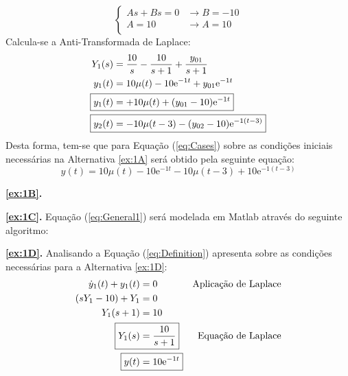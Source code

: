 \documentclass{article}
\begin{document}
\begin{resolution}
\begin{equation*}
\begin{cases}
                            As + Bs = 0 & \rightarrow \boxed{B =-10}\\[1.5mm]
                            A = 10      & \rightarrow \boxed{A = 10}\\
                        \end{cases}
                    \end{equation*}
                Calcula-se a Anti-Transformada de Laplace:
                    \begin{align}
                        Y_{1}(s) &= \frac{10}{s} - \frac{10}{s + 1} + \frac{y_{01}}{s + 1}\nonumber\\
                        y_{1}(t) &= 10\mu(t) - 10\text{e}^{-1t} + y_{01}\text{e}^{-1t}\nonumber\\
                        \Aboxed{y_{1}(t) &=+10\mu(t) + (y_{01} - 10)\text{e}^{-1t}}\\
                        \Aboxed{y_{2}(t) &=-10\mu(t-3) - (y_{02} - 10)\text{e}^{-1(t-3)}}
                    \end{align}
                Desta forma, tem-se que para Equação (\ref{eq:Cases}) sobre as condições iniciais necessárias na Alternativa \ref{ex:1A} será obtido pela seguinte equação:
                    \begin{equation}
                        \boxed{
                            y(t) = 10\mu(t) - 10\text{e}^{-1t} -10\mu(t-3) + 10\text{e}^{-1(t-3)}
                        }\label{eq:General1}
                    \end{equation}
            \end{resolution}
\newpage
            \begin{resolution}
                \textbf{\ref{ex:1B}.} 
            \end{resolution}
\newpage
            \begin{resolution}
                \textbf{\ref{ex:1C}.} Equação (\ref{eq:General1}) será modelada em Matlab através do seguinte algoritmo:
                \begin{scriptsize}
                    \myOctave
                    
                \end{scriptsize}
            \end{resolution}
\newpage
            \begin{resolution}
                \textbf{\ref{ex:1D}.} Analisando a Equação (\ref{eq:Definition}) apresenta sobre as condições necessárias para a Alternativa \ref{ex:1D}:
                    \begin{align}
                        \dot{y}_{1}(t) + y_{1}(t) &= 0 & \text{Aplicação de Laplace}\nonumber\\
                        (sY_{1} - 10) + Y_{1}     &= 0\nonumber\\
                        Y_{1}(s + 1)     &= 10\nonumber\\
                        \Aboxed{Y_{1}(s) &= \frac{10}{s + 1}} & \text{Equação de Laplace}\\
                        \Aboxed{y(t)     &= 10\text{e}^{-1t}}
                    \end{align}
            \end{resolution}
\end{document}
